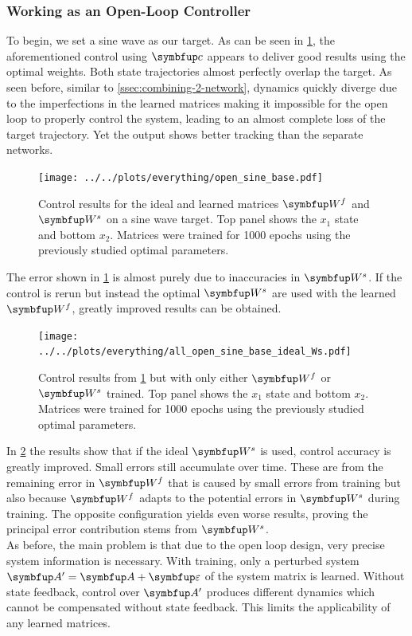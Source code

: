 \subsubsection{Working as an Open-Loop Controller}
To begin, we set a sine wave as our target. As can be seen in \cref{fig:all_open_sine_base}, the aforementioned control using $\bmu{c}$ appears to deliver good results using the optimal weights. Both state trajectories almost perfectly overlap the target. As seen before, similar to \cref{ssec:combining-2-network}, dynamics quickly diverge due to the imperfections in the learned matrices making it impossible for the open loop to properly control the system, leading to an almost complete loss of the target trajectory. Yet the output shows better tracking than the separate networks.
\begin{figure}
	\centering
	\texttt{[image: ../../plots/everything/open\_sine\_base.pdf]}
	\caption{Control results for the ideal and learned matrices $\bmu{W}^f$ and $\bmu{W}^s$ on a sine wave target. Top panel shows the $x_1$ state and bottom $x_2$. Matrices were trained for 1000 epochs using the previously studied optimal parameters.}
	\label{fig:all_open_sine_base}
\end{figure}
The error shown in \cref{fig:all_open_sine_base} is almost purely due to inaccuracies in $\bmu{W}^s$. If the control is rerun but instead the optimal $\bmu{W}^s$ are used with the learned $\bmu{W}^f$, greatly improved results can be obtained.\\
\begin{figure}
	\centering
	\texttt{[image: ../../plots/everything/all\_open\_sine\_base\_ideal\_Ws.pdf]}
	\caption{Control results from \cref{fig:all_open_sine_base} but with only either $\bmu{W}^f$ or $\bmu{W}^s$ trained. Top panel shows the $x_1$ state and bottom $x_2$. Matrices were trained for 1000 epochs using the previously studied optimal parameters.}
	\label{fig:all_open_sine_base_ideal_Ws}
\end{figure}
In \cref{fig:all_open_sine_base_ideal_Ws} the results show that if the ideal $\bmu{W}^s$ is used, control accuracy is greatly improved. Small errors still accumulate over time. These are from the remaining error in $\bmu{W}^f$ that is caused by small errors from training but also because $\bmu{W}^f$ adapts to the potential errors in $\bmu{W}^s$ during training. The opposite configuration yields even worse results, proving the principal error contribution stems from $\bmu{W}^s$.\\
As before, the main problem is that due to the open loop design, very precise system information is necessary. With training, only a perturbed system $\bmu{A}' = \bmu{A} + \bmu{\varepsilon}$ of the system matrix is learned. Without state feedback, control over $\bmu{A}'$ produces different dynamics which cannot be compensated without state feedback. This limits the applicability of any learned matrices.
